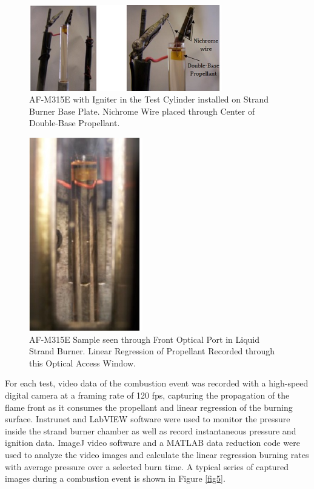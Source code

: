 \documentclass{article}
\begin{document}
\begin{figure}[htb]
\centering
\includegraphics[width=0.75\textwidth]{Figure_3.jpg}
\caption{AF-M315E with Igniter in the Test Cylinder installed on Strand Burner Base Plate. Nichrome Wire placed through Center of Double-Base Propellant.}
\label{fig3}
\end{figure}

\begin{figure}[htb]
\centering
\includegraphics[width=0.25\textheight]{Figure_4.jpg}
\caption{AF-M315E Sample seen through Front Optical Port in Liquid Strand Burner. Linear Regression of Propellant Recorded through this Optical Access Window.}
\label{fig4}
\end{figure}

For each test, video data of the combustion event was recorded with a high-speed digital camera at a framing rate
of 120 fps, capturing the propagation of the flame front as it consumes the propellant and linear regression of the
burning surface. Instrunet and LabVIEW software were used to monitor the pressure inside the strand burner chamber
as well as record instantaneous pressure and ignition data. ImageJ video software and a MATLAB data reduction code
were used to analyze the video images and calculate the linear regression burning rates with average pressure over
a selected burn time. A typical series of captured images during a combustion event is shown in Figure \ref{fig5}.
\end{document}
